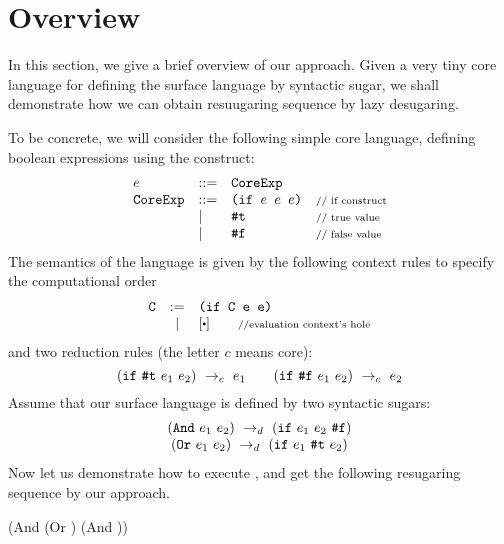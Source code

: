 \section{Overview}
\label{sec2}


In this section, we give a brief overview of our approach. Given a very tiny core language for defining the surface language by syntactic sugar, we shall demonstrate how we can obtain resuugaring sequence by lazy desugaring.


To be concrete, we will consider the following simple core language, defining boolean expressions using the  construct:
\[
\begin{array}{lllll}
e &::=& \mbox{\tt CoreExp}\\
\mbox{\tt CoreExp} &::=& \texttt{(if~$e$~$e$~$e$)} &\mbox{{\scriptsize // if construct}}\\
& |& \mbox{\tt \#t}  & \mbox{{\scriptsize // true value}}\\
& |& \mbox{\tt \#f} & \mbox{{\scriptsize // false value}}
\end{array}
\]
The semantics of the language is given by the following context rules to specify the computational order
\[
\begin{array}{lcl}
\m{C} &:=& \Code{(if C e e)}\\
&|&[\bigcdot] \qquad \note{//evaluation context's hole}\\
\end{array}
\]
and two reduction rules (the letter $c$ means core):
\[
\centering
 \redc{(\m{if}~\m{\true}~e_1~e_2)}{e_1}  \qquad \redc{(\m{if}~\m{\false}~e_1~e_2)}{e_2}
\]
Assume that our surface language is defined by two syntactic sugars:
\[
\begin{array}{c}
(\mbox{\tt And}~e_1~e_2) ~\rightarrow_d~ (\mbox{\tt if}~e_1~e_2~\mbox{\tt \#f})\\
(\mbox{\tt Or}~e_1~e_2) ~\rightarrow_d~ (\mbox{\tt if}~e_1~\mbox{\tt \#t}~e_2)
\end{array}
\]
Now let us demonstrate how to execute , and get the following resugaring sequence by our approach.
{\small
\begin{Codes}
    (And (Or \true \false) (And \false \true))
\end{Codes}
}

